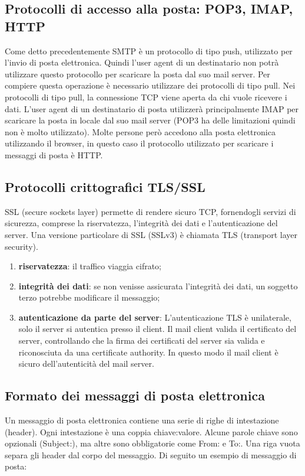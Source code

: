 \subsection{Protocolli di accesso alla posta: POP3, IMAP, HTTP}
Come detto precedentemente SMTP è un protocollo di tipo push, utilizzato per l’invio di posta elettronica. 
Quindi l’user agent di un destinatario non potrà utilizzare questo protocollo per scaricare la posta dal suo mail 
server. Per compiere questa operazione è necessario utilizzare dei protocolli di tipo pull. 
Nei protocolli di tipo pull, la connessione TCP viene aperta da chi vuole ricevere i dati.
L’user agent di un destinatario di posta utilizzerà principalmente IMAP per scaricare la posta in locale dal suo mail server 
(POP3 ha delle limitazioni quindi non è molto utilizzato). 
Molte persone però accedono alla posta elettronica utilizzando il browser, in questo caso il protocollo utilizzato 
per scaricare i messaggi di posta è HTTP.

\subsection{Protocolli crittografici TLS/SSL}
SSL (secure sockets layer) permette di rendere sicuro TCP,  fornendogli servizi di sicurezza, 
comprese la riservatezza, l’integrità dei dati e l’autenticazione del server. 
Una versione particolare di SSL (SSLv3) è chiamata TLS (transport layer security).

\begin{enumerate}
    \item \textbf{riservatezza}: il traffico viaggia cifrato;
    \item \textbf{integrità dei dati}: se non venisse assicurata l'integrità dei dati, un soggetto terzo
    potrebbe modificare il messaggio;
    \item \textbf{autenticazione da parte del server}: L'autenticazione TLS è unilaterale, solo il server si 
    autentica presso il client. Il mail client valida il certificato del server, controllando che la firma dei 
    certificati del server sia valida e riconosciuta da una certificate authority.
    In questo modo il mail client è sicuro dell'autenticità del mail server. 
\end{enumerate}


\subsection{Formato dei messaggi di posta elettronica}
Un messaggio di posta elettronica contiene una serie di righe di intestazione (header).
Ogni intestazione è una coppia chiave:valore. Alcune parole chiave sono opzionali (Subject:), 
ma altre sono obbligatorie come From: e To:. Una riga vuota separa gli header dal corpo del messaggio.
Di seguito un esempio di messaggio di posta:

